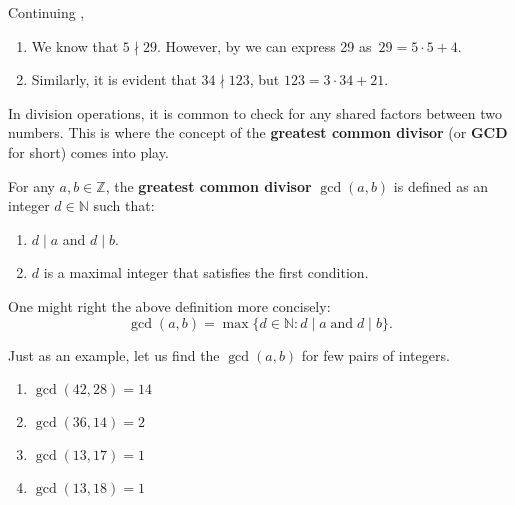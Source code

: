 \documentclass[../lecture-notes-148x210.tex]{subfiles}
\begin{document}
\begin{example} \label{example:divisibility_2}
    Continuing , \hfill
    \begin{enumerate}
        \item We know that $5 \nmid 29$. However, by  we can express 29 
        as~$29 = 5 \cdot 5 + 4$.
        \item Similarly, it is evident that $34 \nmid 123$, but $123 = 3 \cdot 34 + 21$.
    \end{enumerate}
\end{example}

In division operations, it is common to check for any shared factors between two
numbers. This is where the concept of the \textbf{greatest common divisor} (or
\textbf{GCD} for short) comes into play.

\begin{definition}[GCD]
    For any $a, b \in \mathbb{Z}$, the \textbf{greatest common divisor} \cite{Ben_Lynn_1980} $\gcd(a, b)$ is defined as an integer $d \in \mathbb{N}$ such that:
    \begin{enumerate}
        \item $d \mid a$ and $d \mid b$.
        \item $d$ is a maximal integer that satisfies the first condition.
    \end{enumerate}

    One might right the above definition more concisely:
    \begin{equation*}
        \gcd(a,b) = \max\{d \in \mathbb{N}: d \mid a \; \text{and} \; d \mid b\}.
    \end{equation*}
\end{definition}

\begin{example}
    Just as an example, let us find the $\gcd(a, b)$ for few pairs of integers.
    
    \begin{multicols}{2}
        \begin{enumerate}
            \item $\gcd(42, 28) = 14$
            \item $\gcd(36, 14) = 2$
            \item $\gcd(13, 17) = 1$
            \item $\gcd(13, 18) = 1$
        \end{enumerate}
    \end{multicols}
\end{example}
\end{document}
